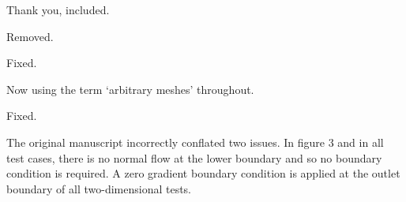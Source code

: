 \documentclass[times]{elsarticle}
\begin{document}
\begin{quotation}
\begin{comment}
\item  p.3, end of first paragraph: I suggest to mention here a
    recent advancement of the finite-volume MPDATA (Kühnlein and
    Smolarkiewicz, J. Comput. Phys. 2017,
    \url{http://dx.doi.org/10.1016/j.jcp.2016.12.054}). Among others, this
    paper demonstrates applicability of MPDATA for 3D compressible
    atmospheric dynamics on arbitrary hybrid unstructured meshes.
\end{comment}
\end{quotation}
Thank you, included.

\begin{quotation}
\begin{comment}
\item  p.3, paragraph after Eq. (2b): if there is no specific need, I
    sugggest to remove "zero-dimensional".
\end{comment}
\end{quotation}
Removed.

\begin{quotation}
\begin{comment}
\item  p.4, last paragraph in Section 2.0: "methods are described next"
    instead of "methods described next".
\end{comment}
\end{quotation}
Fixed.

\begin{quotation}
\begin{comment}
\item  p.5, first paragraph: Is it "arbitrary meshes" or "arbitrary
    structured meshes"?
\end{comment}
\end{quotation}
Now using the term `arbitrary meshes' throughout.

\begin{quotation}
\begin{comment}
\item  p.5, last paragraph of Section 2.1.1.: "dirichlet" should be
    upper case "Dirichlet".
\end{comment}
\end{quotation}
Fixed.

\begin{quotation}
\begin{comment}
\item p.7, caption of Fig. 3, last sentence: It is stated that a
    von Neumann boundary condition is assumed. However, the
    footnote on p.5 says that Neumann BCs are excluded from the
    set of stencil boundary faces?
\end{comment}
\end{quotation}
The original manuscript incorrectly conflated two issues.  In figure 3 and in all test cases, there is no normal flow at the lower boundary and so no boundary condition is required.  A zero gradient boundary condition is applied at the outlet boundary of all two-dimensional tests.
\end{document}
